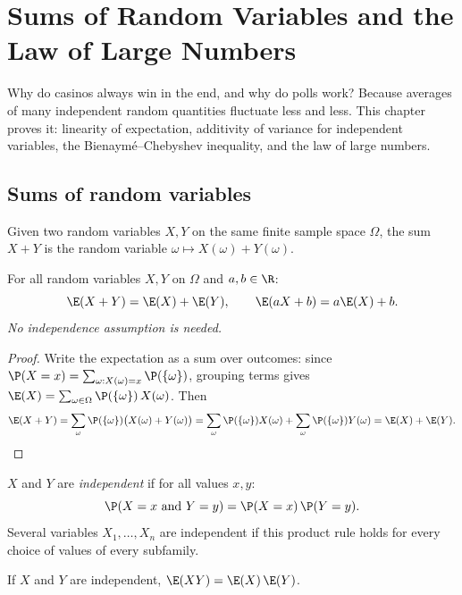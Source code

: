 \chapter{Sums of Random Variables and the Law of Large Numbers}\label{ch:tle:sums}

Why do casinos always win in the end, and why do polls work? Because
averages of many independent random quantities fluctuate less and less. This
chapter proves it: linearity of expectation, additivity of variance for
independent variables, the Bienaymé--Chebyshev inequality, and the law of
large numbers.

\section{Sums of random variables}

Given two random variables $X, Y$ on the same finite sample space
$\Omega$, the sum $X + Y$ is the random variable
$\omega \mapsto X(\omega) + Y(\omega)$.

\begin{theorem}\label{thm:tle:sums:linearity}
For all random variables $X, Y$ on $\Omega$ and $a, b \in \R$:
\[
\E(X + Y) = \E(X) + \E(Y), \qquad \E(aX + b) = a\E(X) + b .
\]
\emph{No independence assumption is needed.}
\end{theorem}

\begin{proof}
Write the expectation as a sum over outcomes: since
$\P(X = x) = \sum_{\omega : X(\omega) = x} \P(\{\omega\})$, grouping terms
gives $\E(X) = \sum_{\omega \in \Omega} \P(\{\omega\})\,X(\omega)$. Then
\[
\E(X + Y) = \sum_{\omega} \P(\{\omega\})\bigl(X(\omega) + Y(\omega)\bigr)
= \sum_{\omega} \P(\{\omega\})X(\omega)
+ \sum_{\omega} \P(\{\omega\})Y(\omega) = \E(X) + \E(Y). \qedhere
\]
\end{proof}

\begin{definition}\label{def:tle:sums:indep}
$X$ and $Y$ are \emph{independent} if
for all values $x, y$:
\[
\P(X = x \text{ and } Y = y) = \P(X = x)\,\P(Y = y).
\]
Several variables $X_1, \dots, X_n$ are independent if this product rule
holds for every choice of values of every subfamily.
\end{definition}

\begin{proposition}\label{prop:tle:sums:prodexp}
If $X$ and $Y$ are independent, $\E(XY) = \E(X)\,\E(Y)$.
\end{proposition}

